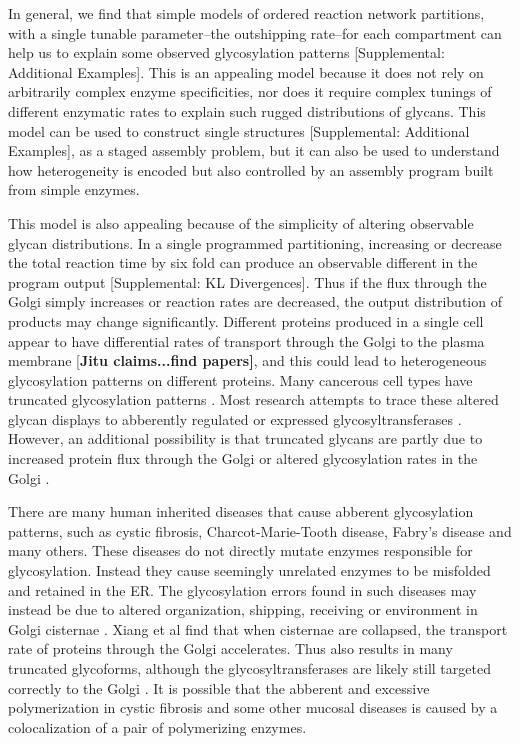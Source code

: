 \documentclass[twocolumn]{article}
\begin{document}
In general, we find that simple models of ordered reaction network partitions, with a single tunable parameter--the outshipping rate--for each compartment can help us to explain some observed glycosylation patterns [Supplemental: Additional Examples]. This is an appealing model because it does not rely on arbitrarily complex enzyme specificities, nor does it require complex tunings of different enzymatic rates to explain such rugged distributions of glycans. This model can be used to construct single structures [Supplemental: Additional Examples], as a staged assembly problem, but it can also be used to understand how heterogeneity is encoded but also controlled by an assembly program built from simple enzymes. 

This model is also appealing because of the simplicity of altering observable glycan distributions. In a single programmed partitioning, increasing or decrease the total reaction time by six fold can produce an observable different in the program output [Supplemental: KL Divergences]. Thus if the flux through the Golgi simply increases or reaction rates are decreased, the output distribution of products may change significantly.  Different proteins produced in a single cell appear to have differential rates of transport through the Golgi to the plasma membrane [\textbf{Jitu claims...find papers]}, and this could lead to heterogeneous glycosylation patterns on different proteins. Many cancerous cell types have truncated glycosylation patterns \cite{Lloyd1996}. Most research attempts to trace these altered glycan displays to abberently regulated or expressed glycosyltransferases \cite{Kannagi2009}. However, an additional possibility is that truncated glycans are partly due to increased protein flux through the Golgi or altered glycosylation rates in the Golgi \cite{Kellokumpu2002,Brockhausen2006}.

There are many human inherited diseases that cause abberent glycosylation patterns, such as cystic fibrosis, Charcot-Marie-Tooth disease, Fabry's disease and many others. These diseases do not directly mutate enzymes responsible for glycosylation. Instead they cause seemingly unrelated enzymes to be misfolded and retained in the ER. The glycosylation errors found in such diseases may instead be due to altered organization, shipping, receiving or environment in Golgi cisternae \cite{Freeze2011}. Xiang et al find that when cisternae are collapsed, the transport rate of proteins through the Golgi accelerates. Thus also results in many truncated glycoforms, although the glycosyltransferases are likely still targeted correctly to the Golgi \cite{Xiang2012}. It is possible that the abberent and excessive polymerization in cystic fibrosis and some other mucosal diseases is caused by a colocalization of a pair of polymerizing enzymes. 
\end{document}
